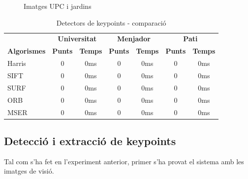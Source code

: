\begin{figure}[!htb]
				\label{fig:awesome_image3}
			\endminipage
			\caption{Imatges UPC i jardins}
		\end{figure}

		\begin{table}[H]
			\begin{center}
				\begin{tabular}{l | c c | c c | c c}
					& \multicolumn{2}{c|}{\textbf{Universitat}} & \multicolumn{2}{c|}{\textbf{Menjador}} & \multicolumn{2}{c}{\textbf{Pati}} \\
					\textbf{Algorismes} & \textbf{Punts} & \textbf{Temps} & \textbf{Punts} & \textbf{Temps} & \textbf{Punts} & \textbf{Temps} \\ \hline
					Harris & 0 & 0ms & 0 & 0ms & 0 & 0ms \\
					SIFT & 0 & 0ms & 0 & 0ms & 0 & 0ms \\
					SURF & 0 & 0ms & 0 & 0ms & 0 & 0ms \\
					ORB & 0 & 0ms & 0 & 0ms & 0 & 0ms \\
					MSER & 0 & 0ms & 0 & 0ms & 0 & 0ms \\
				\end{tabular}
			\end{center}
			\caption{Detectors de keypoints - comparació}
		\end{table}
\newpage
	\subsection{Detecció i extracció de keypoints}
		Tal com s'ha fet en l'experiment anterior, primer s'ha provat el sistema amb les imatges de visió.

